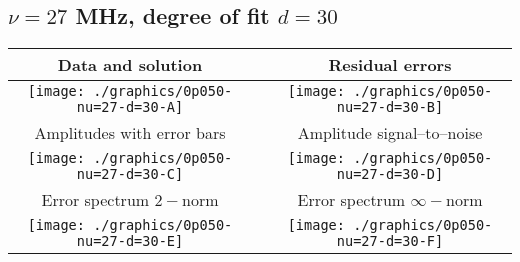

% 

\clearpage{}
\break{}

\subsection{$\nu = 27$ MHz, degree of fit $d = 30$}

\begin{table}[h]
    \begin{center}
        \begin{tabular}{ccc}
            Data and solution & \quad & Residual errors \\\hline
            \texttt{[image: ./graphics/0p050-nu=27-d=30-A]} &&
            \texttt{[image: ./graphics/0p050-nu=27-d=30-B]} \\[15pt]
            Amplitudes with error bars && Amplitude signal--to--noise \\\hline
            \texttt{[image: ./graphics/0p050-nu=27-d=30-C]} &&
            \texttt{[image: ./graphics/0p050-nu=27-d=30-D]} \\[15pt]
            Error spectrum $2-$norm && Error spectrum $\infty-$norm \\\hline
            \texttt{[image: ./graphics/0p050-nu=27-d=30-E]} &&
            \texttt{[image: ./graphics/0p050-nu=27-d=30-F]} \\[15pt]
        \end{tabular}
    \end{center}
\label{fig:elev=50, nu=27}
\end{table}



\endinput
